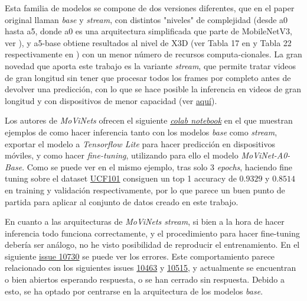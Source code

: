 Esta familia de modelos se compone de dos versiones diferentes, que en el paper original llaman \textit{base} y \textit{stream}, con distintos "niveles" de complejidad (desde a0 hasta a5, donde a0 es una arquitectura simplificada que parte de MobileNetV3, ver \cite{MobileNetV3}), y a5-base obtiene resultados al nivel de X3D \cite{X3D} (ver Tabla 17 en y Tabla 22 respectivamente en \cite{MoViNets}) con un menor número de recursos computa-cionales. La gran novedad que aporta este trabajo es la variante \textit{stream}, que permite tratar videos de gran longitud sin tener que procesar todos los frames por completo antes de devolver una predicción, con lo que se hace posible la inferencia en videos de gran longitud y con dispositivos de menor capacidad (ver \href{https://blog.tensorflow.org/2022/04/video-classification-on-edge-devices.html}{aquí}).

Los autores de \textit{MoViNets} ofrecen el siguiente \href{https://colab.research.google.com/github/tensorflow/models/blob/master/official/projects/movinet/movinet_tutorial.ipynb}{\textit{colab notebook}} en el que muestran ejemplos de como hacer inferencia tanto con los modelos \textit{base} como \textit{stream}, exportar el modelo a \textit{Tensorflow Lite} para hacer predicción en dispositivos móviles, y como hacer \textit{fine-tuning}, utilizando para ello el modelo \textit{MoViNet-A0-Base}. Como se puede ver en el mismo ejemplo, tras solo 3 \textit{epochs}, haciendo fine tuning sobre el dataset \href{https://www.tensorflow.org/datasets/catalog/ucf101}{UCF101} consiguen un top 1 accuracy de $0.9329$ y $0.8514$ en training y validación respectivamente, por lo que parece un buen punto de partida para aplicar al conjunto de datos creado en este trabajo.

En cuanto a las arquitecturas de \textit{MoViNets stream}, si bien a la hora de hacer inferencia todo funciona correctamente, y el procedimiento para hacer fine-tuning debería ser análogo, no he visto posibilidad de reproducir el entrenamiento. En el siguiente \href{https://github.com/tensorflow/models/issues/10730}{issue 10730} se puede ver los errores. Este comportamiento parece relacionado con los siguientes issues \href{https://github.com/tensorflow/models/issues/10463#issuecomment-1019395406_}{10463} y \href{https://github.com/tensorflow/models/issues/10515}{10515}, y actualmente se encuentran o bien abiertos esperando respuesta, o se han cerrado sin respuesta. Debido a esto, se ha optado por centrarse en la arquitectura de los modelos \textit{base}.


